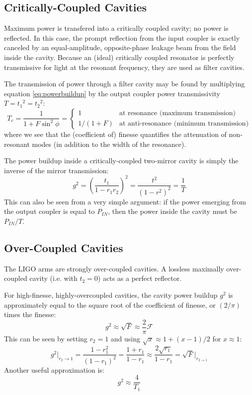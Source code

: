 \subsection{Critically-Coupled Cavities}

Maximum power is transfered into a critically coupled cavity; no power
is reflected. In this case, the prompt reflection from the input coupler
is exactly canceled by an equal-amplitude, opposite-phase leakage
beam from the field inside the cavity. Because an (ideal) critically
coupled resonator is perfectly transmissive for light at the resonant
frequency, they are used as filter cavities.

The transmission of power through a filter cavity may be found by
multiplying equation \ref{eq:powerbuildup} by the output coupler
power transmissivity $T={t_{1}}^{2}={t_{2}}^{2}$: 
\begin{equation}
T_{c}=\frac{1}{1+F\sin^{2}\phi}=\begin{cases}
1 & \text{at resonance (maximum transmission)}\\
1/(1+F) & \text{at anti-resonance (minimum transmission)}
\end{cases}
\end{equation}
where we see that the (coefficient of) finesse quantifies the attenuation
of non-resonant modes (in addition to the width of the resonance).

The power buildup inside a critically-coupled two-mirror cavity is
simply the inverse of the mirror transmission:
\[
g^{2}=\left(\frac{t_{1}}{1-r_{1}r_{2}}\right)^{2}=\frac{t^{2}}{\left(1-r^{2}\right)^{2}}=\frac{1}{T}
\]
This can also be seen from a very simple argument: if the power emerging
from the output coupler is equal to $P_{IN}$, then the power inside
the cavity must be $P_{IN}/T$.


\subsection{Over-Coupled Cavities}

The LIGO arms are strongly over-coupled cavities. A lossless maximally over-coupled
cavity (i.e. with $t_{2}=0$) acts as a perfect reflector. 

For high-finesse, highly-overcoupled cavities, the cavity power buildup
$g^{2}$ is approximately equal to the square root of the coefficient
of finesse, or $(2/\pi)$ times the finesse:
\begin{equation}
g^{2}\approx\sqrt{F}\approx\frac{2}{\pi}\mathcal{F}
\end{equation}
This can be seen by setting $r_{2}=1$ and using $\sqrt{x}\approx1+(x-1)/2$
for $x\approx1$:
\begin{equation}
g^{2}\bigg|_{r_{2}\to1}=\frac{1-r_{1}^{2}}{\left(1-r_{1}\right)^{2}}=\frac{1+r_{1}}{1-r_{1}}\approx\frac{2\sqrt{r_{1}}}{1-r_{1}}=\sqrt{F}\bigg|_{r_{2\to1}}
\end{equation}
%
%
Another useful approximation is:
\[
g^{2}\approx\frac{4}{T_{1}}
\]
